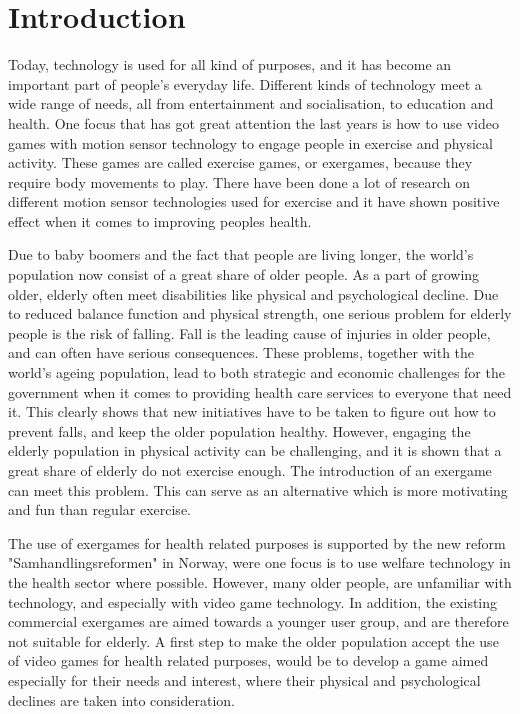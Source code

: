 \chapter{Introduction}

Today, technology is used for all kind of purposes, and it has become an important part of people's everyday life. Different kinds of technology meet a wide range of needs, all from entertainment and socialisation, to education and health. One focus that has got great attention the last years is how to use video games with motion sensor technology to engage people in exercise and physical activity. These games are called exercise games, or exergames, because they require body movements to play. There have been done a lot of research on different motion sensor technologies used for exercise and it have shown positive effect when it comes to improving peoples health. 

Due to baby boomers and the fact that people are living longer, the world's population now consist of a great share of older people. As a part of growing older, elderly often meet disabilities like physical and psychological decline. Due to reduced balance function and physical strength, one serious problem for elderly people is the risk of falling. Fall is the leading cause of injuries in older people, and can often have serious consequences. These problems, together with the world's ageing population, lead to both strategic and economic challenges for the government when it comes to providing health care services to everyone that need it. This clearly shows that new initiatives have to be taken to figure out how to prevent falls, and keep the older population healthy. However, engaging the elderly population in physical activity can be challenging, and it is shown that a great share of elderly do not exercise enough. The introduction of an exergame can meet this problem. This can serve as an alternative which is more motivating and fun than regular exercise.  

The use of exergames for health related purposes is supported by the new reform "Samhandlingsreformen" in Norway, were one focus is to use welfare technology in the health sector where possible. However, many older people, are unfamiliar with technology, and especially with video game technology. In addition, the existing commercial exergames are aimed towards a younger user group, and are therefore not suitable for elderly. A first step to make the older population accept the use of video games for health related purposes, would be to develop a game aimed especially for their needs and interest, where their physical and psychological declines are taken into consideration. 


